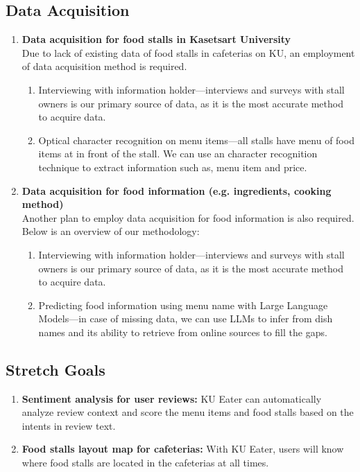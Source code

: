 \subsection{Data Acquisition}
\label{subsection:data-acquisition}

\begin{enumerate}[leftmargin=80pt]
    \item \textbf{Data acquisition for food stalls in Kasetsart University} \\%
        Due to lack of existing data of food stalls in cafeterias on KU, an employment of data acquisition method is required.
        \begin{enumerate}
            \item Interviewing with information holder---interviews and surveys with stall owners is our
            primary source of data, as it is the most accurate method to acquire data.
            \item Optical character recognition on menu items---all stalls have menu of food items at in front of the stall.
            We can use an character recognition technique to extract information such as, menu item and price.
        \end{enumerate}
    \item \textbf{Data acquisition for food information (e.g. ingredients, cooking method)} \\%
        Another plan to employ data acquisition for food information is also required. Below is an overview of our methodology:
        \begin{enumerate}
            \item Interviewing with information holder---interviews and surveys with stall owners is our
            primary source of data, as it is the most accurate method to acquire data.
            \item Predicting food information using menu name with Large Language Models---in case of missing data,
            we can use LLMs to infer from dish names and its ability to retrieve from online sources to fill the gaps.
        \end{enumerate}
\end{enumerate}

\subsection{Stretch Goals}
\label{subsection:stretch-goals}

\begin{enumerate}[leftmargin=80pt]
    \item \textbf{Sentiment analysis for user reviews:} KU Eater can automatically analyze review context and score
    the menu items and food stalls based on the intents in review text.
    \item \textbf{Food stalls layout map for cafeterias:} With KU Eater, users will know where food stalls are located
    in the cafeterias at all times.
\end{enumerate}

